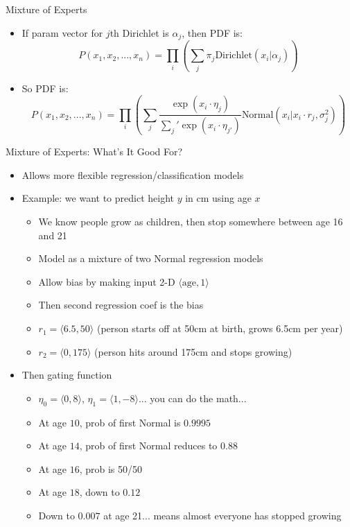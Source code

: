 \documentclass[aspectratio=169]{beamer}
\begin{document}
\begin{frame}{Mixture of Experts}

\begin{itemize}
\item If param vector for $j$th Dirichlet is $\alpha_j$, then PDF is:
$$P(x_1, x_2, ..., x_n) = \prod_i \left( \sum_j \pi_j \textrm{Dirichlet} (x_i | \alpha_j) \right)$$
\item So PDF is:
$$P(x_1, x_2, ..., x_n) = \prod_i \left( \sum_j \frac{\exp (x_i \cdot \eta_j)}{\sum_j' \exp (x_i \cdot \eta_{j'})}  \textrm{Normal} (x_i | x_i \cdot r_j, \sigma^2_j) \right)$$
\end{itemize}
\end{frame}

\begin{frame}{Mixture of Experts: What's It Good For?}

\begin{itemize}
\item Allows more flexible regression/classification models
\item Example: we want to predict height $y$ in cm using age $x$
\begin{itemize}
	\item We know people grow as children, then stop somewhere between age 16 and 21
	\item Model as a mixture of two Normal regression models
	\item Allow bias by making input 2-D $\langle \textrm{age}, 1 \rangle$
	\item Then second regression coef is the bias
	\item $r_1 = \langle 6.5, 50 \rangle$ (person starts off at 50cm at birth, grows 6.5cm per year)
	\item $r_2 = \langle 0, 175 \rangle$ (person hits around 175cm and stops growing)
\end{itemize}
\item Then gating function 
	\begin{itemize}
	\item $\eta_0 = \langle 0, 8 \rangle$, $\eta_1 = \langle 1, -8 \rangle$... you can do the math...
	\item At age $10$, prob of first Normal is $0.9995$
	\item At age $14$, prob of first Normal reduces to $0.88$
	\item At age $16$, prob is 50/50
	\item At age $18$, down to $0.12$
	\item Down to $0.007$ at age 21... means almost everyone has stopped growing
	\end{itemize}
\end{itemize}
\end{frame}
\end{document}
